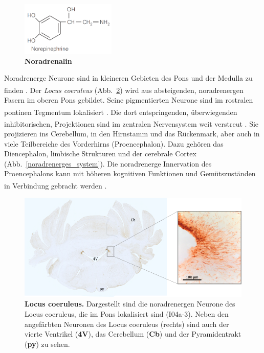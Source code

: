 \documentclass[12pt,a4paper,pdftex]{article}
\begin{document}
\begin{figure}[H]
    \centering
    \includegraphics[width=0.4\textwidth]{pictures/Bilder_monoamine_systeme/noradrenalin.PNG}
    \caption{\textbf{Noradrenalin}}
    \label{fig:noradrenalin}
\end{figure}

Noradrenerge Neurone sind in kleineren Gebieten des Pons und der Medulla zu finden \textsuperscript{\cite[24]{kandel2013principles}}. Der \textit{Locus coeruleus} (Abb.~\ref{fig:locus_coeruleus}) wird aus absteigenden, noradrenergen Fasern im oberen Pons gebildet. Seine pigmentierten Neurone sind im rostralen pontinen Tegmentum lokalisiert \textsuperscript{\cite[8]{crossman2014neuroanatomy}}. Die dort entspringenden, überwiegenden inhibitorischen, Projektionen sind im zentralen Nervensystem weit verstreut \textsuperscript{\cite[6]{trepel2011neuroanatomie}}. Sie projizieren ins Cerebellum, in den Hirnstamm und das Rückenmark, aber auch in viele Teilbereiche des Vorderhirns (Proencephalon). Dazu gehören das Diencephalon, limbische Strukturen und der cerebrale Cortex (Abb.~\ref{noradrenerges_system}). Die noradrenerge Innervation des Proencephalons kann mit höheren kognitiven Funktionen und Gemütszuständen in Verbindung gebracht werden \textsuperscript{\cite[8]{crossman2014neuroanatomy}}.

\begin{figure}[H]
    \centering
    \includegraphics[width=\textwidth]{pictures/Bilder_monoamine_systeme/locus_coeruleus.png}
    \caption[Locus coeruleus]{\textbf{Locus coeruleus.} Dargestellt sind die noradrenergen Neurone des Locus coeruleus, die im Pons lokalisiert sind (I04a-3). Neben den angefärbten Neuronen des Locus coeruleus (rechts) sind auch der vierte Ventrikel (\textbf{4V}), das Cerebellum (\textbf{Cb}) und der Pyramidentrakt (\textbf{py}) zu sehen.}
    \label{fig:locus_coeruleus}
\end{figure}
\end{document}
